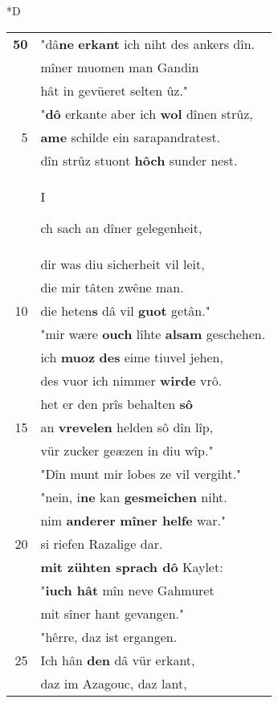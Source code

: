 \documentclass[8pt,a4paper,notitlepage]{article}
\begin{document}
\begin{table}[ht]
\begin{minipage}[t]{0.5\linewidth}
\small
\begin{center}*D
\end{center}
\begin{tabular}{rl}
\textbf{50} & "dâ\textbf{ne} \textbf{erkant} ich niht des ankers dîn.\\ 
 & mîner muomen man Gandin\\ 
 & hât in gevüeret selten ûz."\\ 
 & "\textbf{dô} erkante aber ich \textbf{wol} dînen strûz,\\ 
5 & \textbf{ame} schilde ein sarapandratest.\\ 
 & dîn strûz stuont \textbf{hôch} sunder nest.\\ 
 & \begin{large}I\end{large}ch sach an dîner gelegenheit,\\ 
 & dir was diu sicherheit vil leit,\\ 
 & die mir tâten zwêne man.\\ 
10 & die heten\textbf{s} dâ vil \textbf{guot} getân."\\ 
 & "mir wære \textbf{ouch} lîhte \textbf{alsam} geschehen.\\ 
 & ich \textbf{muoz} \textbf{des} eime tiuvel jehen,\\ 
 & des vuor ich nimmer \textbf{wirde} vrô.\\ 
 & het er den prîs behalten \textbf{sô}\\ 
15 & an \textbf{vrevelen} helden sô dîn lîp,\\ 
 & vür zucker geæzen in diu wîp."\\ 
 & "Dîn munt mir lobes ze vil vergiht."\\ 
 & "nein, i\textbf{ne} kan \textbf{gesmeichen} niht.\\ 
 & nim \textbf{anderer} \textbf{mîner helfe} war."\\ 
20 & si riefen Razalige dar.\\ 
 & \textbf{mit zühten sprach dô} Kaylet:\\ 
 & "\textbf{iuch hât} mîn neve Gahmuret\\ 
 & mit sîner hant gevangen."\\ 
 & "hêrre, daz ist ergangen.\\ 
25 & Ich hân \textbf{den} dâ vür erkant,\\ 
 & daz im Azagouc, daz lant,\\ 

\end{tabular}
\end{minipage}
\end{table}
\end{document}

